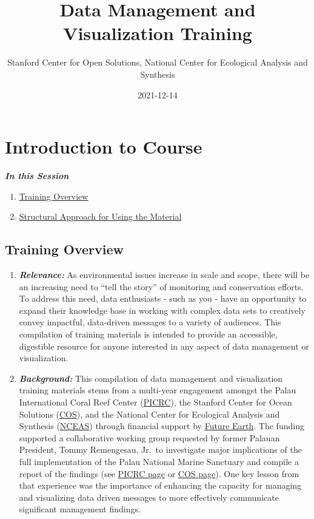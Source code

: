 \documentclass[
]{book}
\title{Data Management and Visualization Training}
\author{Stanford Center for Open Solutions, National Center for Ecological Analysis and Synthesis}
\date{2021-12-14}
\providecommand{\tightlist}{%
  \setlength{\itemsep}{0pt}\setlength{\parskip}{0pt}}
\begin{document}
\maketitle

{
\setcounter{tocdepth}{1}
\tableofcontents
}
\hypertarget{introduction-to-course}{%
\chapter{Introduction to Course}\label{introduction-to-course}}

\textbf{\emph{In this Session}}

\begin{enumerate}
\def\labelenumi{\arabic{enumi}.}
\tightlist
\item
  \protect\hyperlink{training-overview}{Training Overview}
\item
  \protect\hyperlink{how-to-use-these-materials}{Structural Approach for Using the Material}
\end{enumerate}

\hypertarget{training-overview}{%
\section{Training Overview}\label{training-overview}}

\begin{enumerate}
\def\labelenumi{\arabic{enumi}.}
\item
  \textbf{\emph{Relevance:}} As environmental issues increase in scale and scope, there will be an increasing need to ``tell the story'' of monitoring and conservation efforts. To address this need, data enthusiasts - such as you - have an opportunity to expand their knowledge base in working with complex data sets to creatively convey impactful, data-driven messages to a variety of audiences. This compilation of training materials is intended to provide an accessible, digestible resource for anyone interested in any aspect of data management or visualization.
\item
  \textbf{\emph{Background:}} This compilation of data management and visualization training materials stems from a multi-year engagement amongst the Palau International Coral Reef Center (\href{https://picrc.org/picrcpage/}{PICRC}), the Stanford Center for Ocean Solutions (\href{https://oceansolutions.stanford.edu/}{COS}), and the National Center for Ecological Analysis and Synthesis (\href{https://www.nceas.ucsb.edu/}{NCEAS}) through financial support by \href{https://futureearth.org/}{Future Earth}. The funding supported a collaborative working group requested by former Palauan President, Tommy Remengesau, Jr.~to investigate major implications of the full implementation of the Palau National Marine Sanctuary and compile a report of the findings (see \href{https://picrc.org/picrcpage/palau-national-marine-sanctuary/}{PICRC page} or \href{https://oceansolutions.stanford.edu/pnms-report}{COS page}). One key lesson from that experience was the importance of enhancing the capacity for managing and visualizing data driven messages to more effectively communicate significant management findings.
\end{enumerate}
\end{document}
